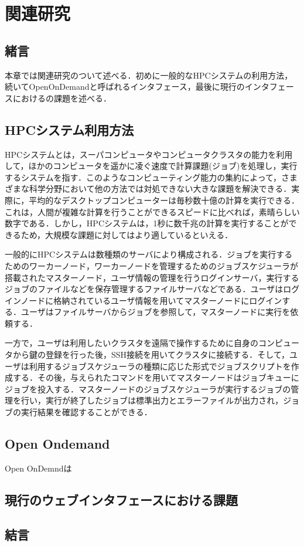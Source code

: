 
\section{関連研究}

\subsection{緒言}
本章では関連研究のついて述べる．初めに一般的なHPCシステムの利用方法，続いてOpenOnDemandと呼ばれるインタフェース，最後に現行のインタフェースにおけるの課題を述べる．

\subsection{HPCシステム利用方法}
HPCシステムとは，スーパコンピュータやコンピュータクラスタの能力を利用して，ほかのコンピュータを遥かに凌ぐ速度で計算課題(ジョブ)を処理し，実行するシステムを指す．このようなコンピューティング能力の集約によって，さまざまな科学分野において他の方法では対処できない大きな課題を解決できる．実際に，平均的なデスクトップコンピューターは毎秒数十億の計算を実行できる．これは，人間が複雑な計算を行うことができるスピードに比べれば，素晴らしい数字である．しかし，HPCシステムは，1秒に数千兆の計算を実行することができるため，大規模な課題に対してはより適しているといえる．\par
一般的にHPCシステムは数種類のサーバにより構成される．ジョブを実行するためのワーカーノード，ワーカーノードを管理するためのジョブスケジューラが搭載されたマスターノード，ユーザ情報の管理を行うログインサーバ，実行するジョブのファイルなどを保存管理するファイルサーバなどである．ユーザはログインノードに格納されているユーザ情報を用いてマスターノードにログインする．ユーザはファイルサーバからジョブを参照して，マスターノードに実行を依頼する．\par
一方で，ユーザは利用したいクラスタを遠隔で操作するために自身のコンピュータから鍵の登録を行った後，SSH接続を用いてクラスタに接続する．そして，ユーザは利用するジョブスケジューラの種類に応じた形式でジョブスクリプトを作成する．その後，与えられたコマンドを用いてマスターノードはジョブキューにジョブを投入する．マスターノードのジョブスケジューラが実行するジョブの管理を行い，実行が終了したジョブは標準出力とエラーファイルが出力され，ジョブの実行結果を確認することができる．\par

\subsection{Open Ondemand}
Open OnDemnd\cite{cite2}\cite{cite3}は

\subsection{現行のウェブインタフェースにおける課題}

\subsection{結言}
